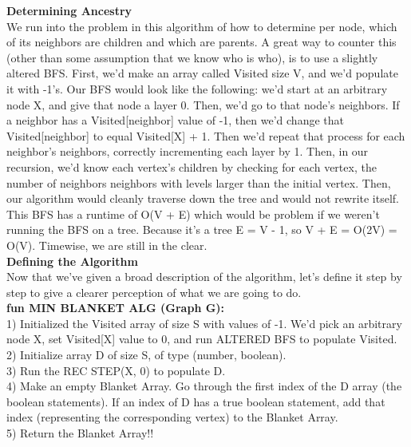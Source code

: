 \documentclass[11pt, solution, letterpaper]{format}
\begin{document}
\textbf{Determining Ancestry}\\
We run into the problem in this algorithm of how to determine per node, which of its neighbors are children and which are parents. A great way to counter this (other than some assumption that we know who is who), is to use a slightly altered BFS. First, we'd make an array called Visited size V, and we'd populate it with -1's. Our BFS would look like the following: we'd start at an arbitrary node X, and give that node a layer 0. Then, we'd go to that node's neighbors. If a neighbor has a Visited[neighbor] value of -1, then we'd change that Visited[neighbor] to equal Visited[X] + 1. Then we'd repeat that process for each neighbor's neighbors, correctly incrementing each layer by 1. Then, in our recursion, we'd know each vertex's children by checking for each vertex, the number of neighbors neighbors with levels larger than the initial vertex. Then, our algorithm would cleanly traverse down the tree and would not rewrite itself. This BFS has a runtime of O(V + E) which would be problem if we weren't running the BFS on a tree. Because it's a tree E = V - 1, so V + E = O(2V) = O(V). Timewise, we are still in the clear.\\

\textbf{Defining the Algorithm}\\
Now that we've given a broad description of the algorithm, let's define it step by step to give a clearer perception of what we are going to do.\\

\textbf{fun MIN BLANKET ALG (Graph G):}\\
1) Initialized the Visited array of size S with values of -1. We'd pick an arbitrary node X, set Visited[X] value to 0, and run ALTERED BFS to populate Visited.\\
2) Initialize array D of size S, of type (number, boolean).\\
3) Run the REC STEP(X, 0) to populate D.\\
4) Make an empty Blanket Array. Go through the first index of the D array (the boolean statements). If an index of D has a true boolean statement, add that index (representing the corresponding vertex) to the Blanket Array.\\
5) Return the Blanket Array!!\\
\end{document}
